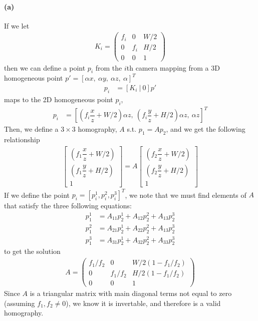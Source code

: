 \documentclass{article}
\newcommand{\spart}[1]{\paragraph{(#1)}}
\begin{document}
\spart{a} If we let
\begin{align}
	K_i = \begin{pmatrix}
		f_i & 0 & W/2 \\ 0 & f_i & H/2 \\ 0 & 0 & 1
	\end{pmatrix}
\end{align}
then we can define a point $p_i$ from the $i$th camera mapping from a 3D homogeneous point $p' = \left[\alpha x,\ \alpha y,\ \alpha z,\ \alpha\right]^T$
\begin{align}
	p_i &= [K_i \ | \ 0]p' 
\end{align}
maps to the 2D homogeneous point $p_i$,
\begin{align}
	p_i &= \left[\left(f_i\dfrac{x}{z}+W/2\right)\alpha z,\ \left(f_i\dfrac{y}{z}+H/2\right)\alpha z,\ \alpha z\right]^T
\end{align}
Then, we define a $3\times3$ homography, $A$ s.t. $	p_1 = A p_2$, and we get the following relationship
\begin{align}
	\begin{bmatrix}
		\left(f_1\dfrac{x}{z}+W/2\right) \\ \left(f_1\dfrac{y}{z}+H/2\right) \\ 1
	\end{bmatrix} = A 	\begin{bmatrix}
	\left(f_2\dfrac{x}{z}+W/2\right) \\ \left(f_2\dfrac{y}{z}+H/2\right) \\ 1
\end{bmatrix}
\end{align}
If we define the point $p_i = [p_i^1, p_i^2, p_i^3]^T$, we note that we must find elements of $A$ that satisfy the three following equations:
\begin{align}
	p_1^1 &= A_{11}p_2^1 + A_{12}p_2^2 + A_{13}p_2^3 \\
	p_1^2 &= A_{21}p_2^1 + A_{22}p_2^2 + A_{13}p_2^3 \\
	p_1^3 &= A_{31}p_2^1 + A_{32}p_2^2 + A_{33}p_2^3 
\end{align}
to get the solution
\begin{align}
	A = \begin{pmatrix}
			f_1/f_2 & 0 & W/2(1-f_1/f_2) \\
			0 & f_1/f_2 & H/2(1-f_1/f_2) \\
			0 & 0 & 1
		\end{pmatrix}
\end{align}
Since $A$ is a triangular matrix with main diagonal terms not equal to zero (assuming $f_1, f_2 \neq 0$), we know it is invertable, and therefore is a valid homography. 
\end{document}
